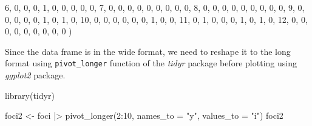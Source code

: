 \documentclass[
  letterpaper,
  DIV=11,
  numbers=noendperiod]{scrreprt}
\newenvironment{Shaded}{\begin{snugshade}}{\end{snugshade}}
\newcommand{\AttributeTok}[1]{\textcolor[rgb]{0.40,0.45,0.13}{#1}}
\newcommand{\DecValTok}[1]{\textcolor[rgb]{0.68,0.00,0.00}{#1}}
\newcommand{\FunctionTok}[1]{\textcolor[rgb]{0.28,0.35,0.67}{#1}}
\newcommand{\NormalTok}[1]{\textcolor[rgb]{0.00,0.23,0.31}{#1}}
\newcommand{\OtherTok}[1]{\textcolor[rgb]{0.00,0.23,0.31}{#1}}
\newcommand{\SpecialCharTok}[1]{\textcolor[rgb]{0.37,0.37,0.37}{#1}}
\newcommand{\StringTok}[1]{\textcolor[rgb]{0.13,0.47,0.30}{#1}}
\begin{document}
\begin{Shaded}
\begin{Highlighting}[]
           \DecValTok{6}\NormalTok{,   }\DecValTok{0}\NormalTok{,   }\DecValTok{0}\NormalTok{,   }\DecValTok{0}\NormalTok{,   }\DecValTok{1}\NormalTok{,   }\DecValTok{0}\NormalTok{,   }\DecValTok{0}\NormalTok{,   }\DecValTok{0}\NormalTok{,   }\DecValTok{0}\NormalTok{,   }\DecValTok{0}\NormalTok{,}
           \DecValTok{7}\NormalTok{,   }\DecValTok{0}\NormalTok{,   }\DecValTok{0}\NormalTok{,   }\DecValTok{0}\NormalTok{,   }\DecValTok{0}\NormalTok{,   }\DecValTok{0}\NormalTok{,   }\DecValTok{0}\NormalTok{,   }\DecValTok{0}\NormalTok{,   }\DecValTok{0}\NormalTok{,   }\DecValTok{0}\NormalTok{,}
           \DecValTok{8}\NormalTok{,   }\DecValTok{0}\NormalTok{,   }\DecValTok{0}\NormalTok{,   }\DecValTok{0}\NormalTok{,   }\DecValTok{0}\NormalTok{,   }\DecValTok{0}\NormalTok{,   }\DecValTok{0}\NormalTok{,   }\DecValTok{0}\NormalTok{,   }\DecValTok{0}\NormalTok{,   }\DecValTok{0}\NormalTok{,}
           \DecValTok{9}\NormalTok{,   }\DecValTok{0}\NormalTok{,   }\DecValTok{0}\NormalTok{,   }\DecValTok{0}\NormalTok{,   }\DecValTok{0}\NormalTok{,   }\DecValTok{0}\NormalTok{,   }\DecValTok{1}\NormalTok{,   }\DecValTok{0}\NormalTok{,   }\DecValTok{1}\NormalTok{,   }\DecValTok{0}\NormalTok{,}
          \DecValTok{10}\NormalTok{,   }\DecValTok{0}\NormalTok{,   }\DecValTok{0}\NormalTok{,   }\DecValTok{0}\NormalTok{,   }\DecValTok{0}\NormalTok{,   }\DecValTok{0}\NormalTok{,   }\DecValTok{0}\NormalTok{,   }\DecValTok{1}\NormalTok{,   }\DecValTok{0}\NormalTok{,   }\DecValTok{0}\NormalTok{,}
          \DecValTok{11}\NormalTok{,   }\DecValTok{0}\NormalTok{,   }\DecValTok{1}\NormalTok{,   }\DecValTok{0}\NormalTok{,   }\DecValTok{0}\NormalTok{,   }\DecValTok{0}\NormalTok{,   }\DecValTok{1}\NormalTok{,   }\DecValTok{0}\NormalTok{,   }\DecValTok{1}\NormalTok{,   }\DecValTok{0}\NormalTok{,}
          \DecValTok{12}\NormalTok{,   }\DecValTok{0}\NormalTok{,   }\DecValTok{0}\NormalTok{,   }\DecValTok{0}\NormalTok{,   }\DecValTok{0}\NormalTok{,   }\DecValTok{0}\NormalTok{,   }\DecValTok{0}\NormalTok{,   }\DecValTok{0}\NormalTok{,   }\DecValTok{0}\NormalTok{,   }\DecValTok{0}
\NormalTok{          )}
\end{Highlighting}
\end{Shaded}

Since the data frame is in the wide format, we need to reshape it to the
long format using \texttt{pivot\_longer} function of the \emph{tidyr}
package before plotting using \emph{ggplot2} package.

\begin{Shaded}
\begin{Highlighting}[]
\FunctionTok{library}\NormalTok{(tidyr)}

\NormalTok{foci2 }\OtherTok{\textless{}{-}}\NormalTok{ foci }\SpecialCharTok{|\textgreater{}} 
  \FunctionTok{pivot\_longer}\NormalTok{(}\DecValTok{2}\SpecialCharTok{:}\DecValTok{10}\NormalTok{, }\AttributeTok{names\_to =} \StringTok{"y"}\NormalTok{, }\AttributeTok{values\_to =} \StringTok{"i"}\NormalTok{)}
\NormalTok{foci2}
\end{Highlighting}
\end{Shaded}
\end{document}
